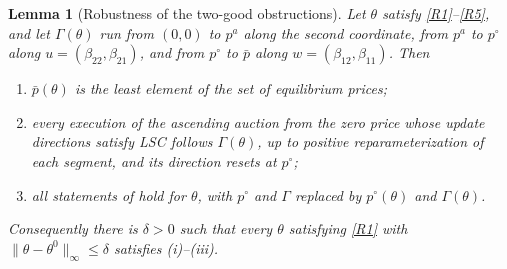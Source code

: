 \documentclass[11pt,a4paper,fleqn]{article}
\theoremstyle{plain}
\newtheorem{lemma}{Lemma}[section]
\theoremstyle{definition}
\begin{document}
\begin{lemma}[Robustness of the two-good obstructions]\label{lem:two-good-robustness}
Let $\theta$ satisfy \ref{R1}--\ref{R5}, and let $\Gamma(\theta)$ run from $(0,0)$ to $p^a$ along the second coordinate, from $p^a$ to $p^\circ$ along $u=(\beta_{22},\beta_{21})$, and from $p^\circ$ to $\bar p$ along $w=(\beta_{12},\beta_{11})$. Then
\begin{enumerate}[label=\textup{(\roman*)},leftmargin=2.2em]
\item $\bar p(\theta)$ is the least element of the set of equilibrium prices;
\item every execution of the ascending auction from the zero price whose update directions satisfy LSC follows $\Gamma(\theta)$, up to positive reparameterization of each segment, and its direction resets at $p^\circ$;
\item all statements of  hold for $\theta$, with $p^\circ$ and $\Gamma$ replaced by $p^\circ(\theta)$ and $\Gamma(\theta)$.
\end{enumerate}
Consequently there is $\delta>0$ such that every $\theta$ satisfying \ref{R1} with $\lVert\theta-\theta^0\rVert_\infty\le\delta$ satisfies \textup{(i)}--\textup{(iii)}.
\end{lemma}
\end{document}
